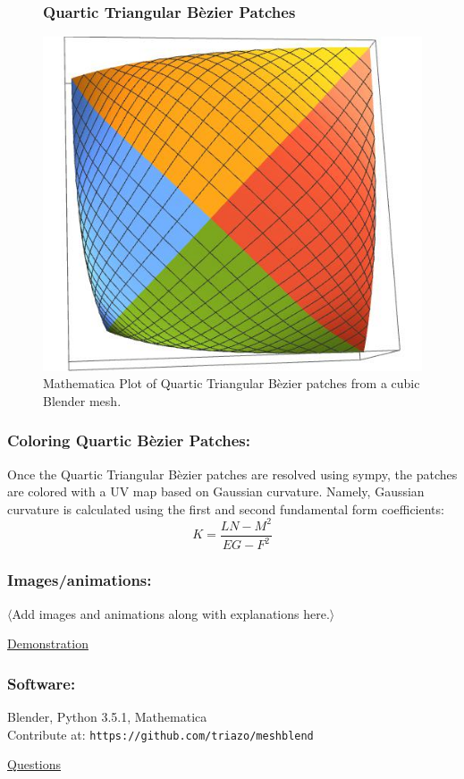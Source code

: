 \documentclass[11pt]{beamer}
\begin{document}
	\begin{frame}
		\begin{figure}[h]
			\frametitle{Quartic Triangular B\`ezier Patches}
			\centering
			\includegraphics[width=.43\linewidth]{img/bezier_patch}
			\caption{Mathematica Plot of Quartic Triangular B\`ezier patches from  a cubic Blender mesh.}
		\end{figure}
	\end{frame}

	\begin{frame}
		\frametitle{Coloring Quartic B\`ezier Patches:}
			Once the Quartic Triangular B\`ezier patches are resolved using sympy, the patches are colored with a UV map based on Gaussian curvature. Namely, Gaussian curvature is calculated using the first and second fundamental form coefficients: $$K = \dfrac{LN-M^2}{EG-F^2}$$
	\end{frame}

	\begin{frame}
		\frametitle{Images/animations:}
		$\langle$Add images and animations along with explanations here.$\rangle$
	\end{frame}

	
	\begin{frame}
		\centering
		\underline{{\huge Demonstration}}
	\end{frame}
	

	\begin{frame} 
		\frametitle{Software:}
		Blender, Python 3.5.1, Mathematica\\
		\vspace{0.50in}
		Contribute at: \texttt{https://github.com/triazo/meshblend}
	\end{frame}

	\begin{frame}
		\centering
		\underline{{\huge Questions}}
	\end{frame}
	
\end{document}
